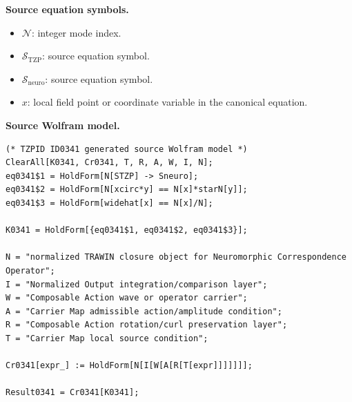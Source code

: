 \begin{minipage}[t]{0.49\linewidth}
\begingroup
\small
\raggedright
\textbf{Source equation symbols.}\par
\begin{itemize}[leftmargin=1.35em,itemsep=1pt,topsep=1pt,parsep=0pt]
    \item $\mathcal{N}$: integer mode index.
    \item $\mathcal{S}_{\mathrm{TZP}}$: source equation symbol.
    \item $\mathcal{S}_{\mathrm{neuro}}$: source equation symbol.
    \item $x$: local field point or coordinate variable in the canonical equation.
\end{itemize}
\endgroup
\end{minipage}\hfill
\begin{minipage}[t]{0.47\linewidth}
\begingroup
\scriptsize
\raggedright
\textbf{Source Wolfram model.}\par
\begin{Verbatim}[fontsize=\tiny,breaklines=true,breakanywhere=true]
(* TZPID ID0341 generated source Wolfram model *)
ClearAll[K0341, Cr0341, T, R, A, W, I, N];
eq0341$1 = HoldForm[N[STZP] -> Sneuro];
eq0341$2 = HoldForm[N[xcirc*y] == N[x]*starN[y]];
eq0341$3 = HoldForm[widehat[x] == N[x]/N];

K0341 = HoldForm[{eq0341$1, eq0341$2, eq0341$3}];

N = "normalized TRAWIN closure object for Neuromorphic Correspondence Operator";
I = "Normalized Output integration/comparison layer";
W = "Composable Action wave or operator carrier";
A = "Carrier Map admissible action/amplitude condition";
R = "Composable Action rotation/curl preservation layer";
T = "Carrier Map local source condition";

Cr0341[expr_] := HoldForm[N[I[W[A[R[T[expr]]]]]]];

Result0341 = Cr0341[K0341];
\end{Verbatim}
\endgroup
\end{minipage}

